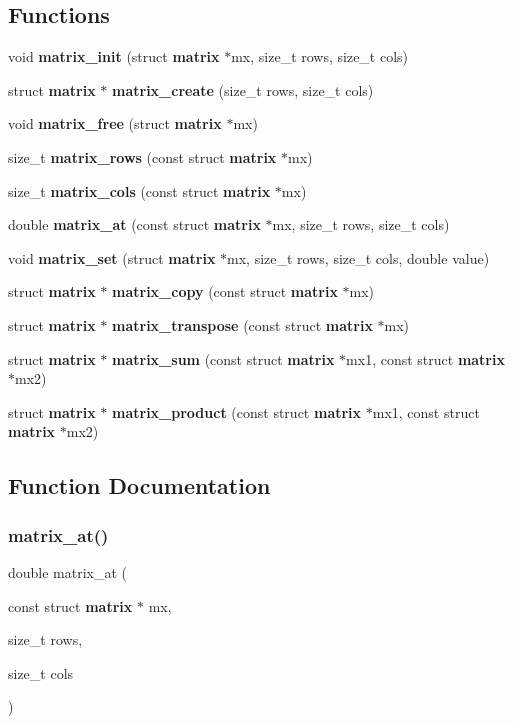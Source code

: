 \subsection*{Functions}
\begin{DoxyCompactItemize}
\item 
void \textbf{ matrix\+\_\+init} (struct \textbf{ matrix} $\ast$mx, size\+\_\+t rows, size\+\_\+t cols)
\item 
struct \textbf{ matrix} $\ast$ \textbf{ matrix\+\_\+create} (size\+\_\+t rows, size\+\_\+t cols)
\item 
void \textbf{ matrix\+\_\+free} (struct \textbf{ matrix} $\ast$mx)
\item 
size\+\_\+t \textbf{ matrix\+\_\+rows} (const struct \textbf{ matrix} $\ast$mx)
\item 
size\+\_\+t \textbf{ matrix\+\_\+cols} (const struct \textbf{ matrix} $\ast$mx)
\item 
double \textbf{ matrix\+\_\+at} (const struct \textbf{ matrix} $\ast$mx, size\+\_\+t rows, size\+\_\+t cols)
\item 
void \textbf{ matrix\+\_\+set} (struct \textbf{ matrix} $\ast$mx, size\+\_\+t rows, size\+\_\+t cols, double value)
\item 
struct \textbf{ matrix} $\ast$ \textbf{ matrix\+\_\+copy} (const struct \textbf{ matrix} $\ast$mx)
\item 
struct \textbf{ matrix} $\ast$ \textbf{ matrix\+\_\+transpose} (const struct \textbf{ matrix} $\ast$mx)
\item 
struct \textbf{ matrix} $\ast$ \textbf{ matrix\+\_\+sum} (const struct \textbf{ matrix} $\ast$mx1, const struct \textbf{ matrix} $\ast$mx2)
\item 
struct \textbf{ matrix} $\ast$ \textbf{ matrix\+\_\+product} (const struct \textbf{ matrix} $\ast$mx1, const struct \textbf{ matrix} $\ast$mx2)
\end{DoxyCompactItemize}


\subsection{Function Documentation}
\mbox{\label{matrix_8c_ace105cd24473b52d67874132e81dd55b}} 
\subsubsection{matrix\+\_\+at()}
{\footnotesize\ttfamily double matrix\+\_\+at (\begin{DoxyParamCaption}\item[{const struct \textbf{ matrix} $\ast$}]{mx,  }\item[{size\+\_\+t}]{rows,  }\item[{size\+\_\+t}]{cols }\end{DoxyParamCaption})\hspace{0.3cm}{\ttfamily [inline]}}

